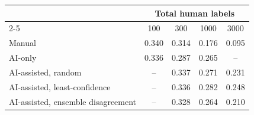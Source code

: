 \begin{tabular}{lcccc}
\toprule
 & \multicolumn{4}{c}{Total human labels} \\
\cmidrule(lr){2-5}
 & 100 & 300 & 1000 & 3000 \\
\midrule
Manual & 0.340 & 0.314 & 0.176 & 0.095 \\
AI-only & 0.336 & 0.287 & 0.265 & -- \\
AI-assisted, random & -- & 0.337 & 0.271 & 0.231 \\
AI-assisted, least-confidence & -- & 0.336 & 0.282 & 0.248 \\
AI-assisted, ensemble disagreement & -- & 0.328 & 0.264 & 0.210 \\
\bottomrule
\end{tabular}
